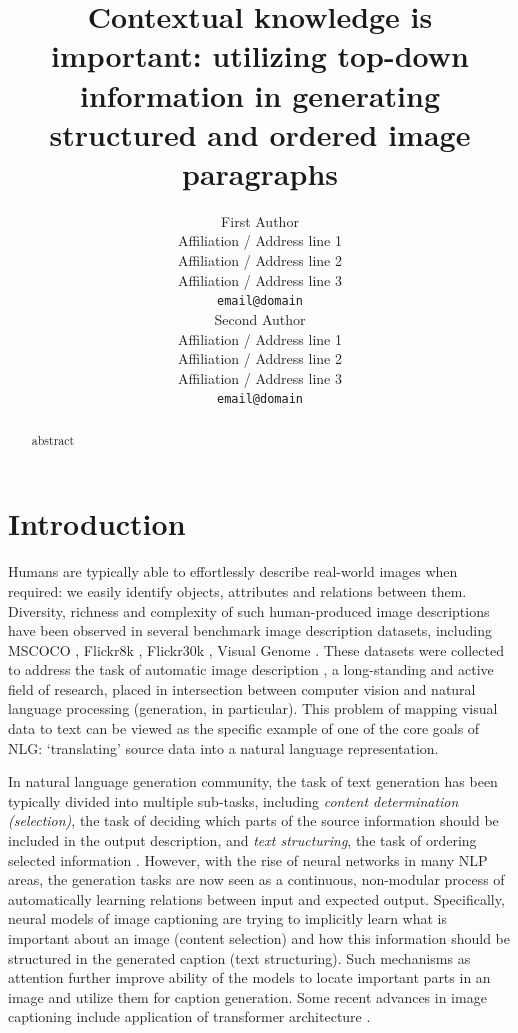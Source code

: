 \documentclass[11pt,a4paper]{article}
\title{Contextual knowledge is important: utilizing top-down information in generating structured and ordered image paragraphs}
\author{First Author \\
  Affiliation / Address line 1 \\
  Affiliation / Address line 2 \\
  Affiliation / Address line 3 \\
  \texttt{email@domain} \\\And
  Second Author \\
  Affiliation / Address line 1 \\
  Affiliation / Address line 2 \\
  Affiliation / Address line 3 \\
  \texttt{email@domain} \\}
\date{}
\begin{document}
\maketitle
\begin{abstract}
abstract

\end{abstract}

\section{Introduction}



Humans are typically able to effortlessly describe real-world images when required: we easily identify objects, attributes and relations between them.
Diversity, richness and complexity of such human-produced image descriptions have been observed in several benchmark image description datasets, including MSCOCO \cite{lin2014microsoft,chen2015microsoft}, Flickr8k \cite{hodosh2013}, Flickr30k \cite{young-etal-2014-image}, Visual Genome \cite{krishnavisualgenome}.
These datasets were collected to address the task of automatic image description \cite{bernardi2016automatic}, a long-standing and active field of research, placed in intersection between computer vision and natural language processing (generation, in particular).
This problem of mapping visual data to text can be viewed as the specific example of one of the core goals of NLG: `translating' source data into a natural language representation.

In natural language generation community, the task of text generation has been typically divided into multiple sub-tasks, including \textit{content determination (selection)}, the task of deciding which parts of the source information should be included in the output description, and \textit{text structuring}, the task of ordering selected information \cite{Gatt2017}.
However, with the rise of neural networks in many NLP areas, the generation tasks are now seen as a continuous, non-modular process of automatically learning relations between input and expected output. Specifically, neural models of image captioning \cite{kiros14,vinyals2014tell} are trying to implicitly learn what is important about an image (content selection) and how this information should be structured in the generated caption (text structuring).
Such mechanisms as attention \cite{xu2015attend,anderson2017bottomup} further improve ability of the models to locate important parts in an image and utilize them for caption generation. Some recent advances in image captioning include application of transformer architecture \cite{vaswani2017attention,herdade2019image}.
\end{document}
